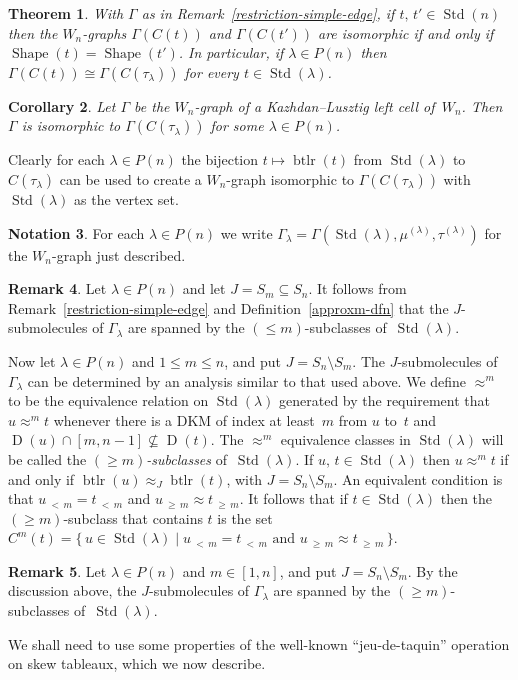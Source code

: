 \documentclass[10pt]{amsart}
\newtheorem{theo}{Theorem}[section]
\newtheorem{coro}[theo]{Corollary}
\theoremstyle{definition}
\newtheorem{rema}[theo]{Remark}
\newtheorem{nota}[theo]{Notation}
\DeclareMathOperator{\word}{btlr}
\newcommand{\lessthan}[2]{#1\,{_{<\,#2}}}
\newcommand{\Morethan}[2]{#1\,{_{\geqslant\,#2}}}
\DeclareMathOperator{\STD}{Std}
\DeclareMathOperator{\shape}{Shape}
\DeclareMathOperator{\D}{D}
\begin{document}
\begin{theo}\label{klthr}
With $\Gamma$ as in Remark~\ref{restriction-simple-edge}, if $t,\,t'\in\STD(n)$
then the $W_n$-graphs $\Gamma(C(t))$ and $\Gamma(C(t'))$
are isomorphic if and only if $\shape(t)=\shape(t')$.
In particular, if $\lambda\in P(n)$ then
$\Gamma(C(t))\cong \Gamma(C(\tau_{\lambda}))$ for every $t\in\STD(\lambda)$.
\end{theo}

\begin{coro}\label{leftcelllambda}
Let $\Gamma$ be the $W_n$-graph of a Kazhdan--Lusztig left cell of~$W_n$. Then
$\Gamma$ is isomorphic to $\Gamma(C(\tau_\lambda))$ for some
$\lambda\in P(n)$.
\end{coro}
Clearly for each $\lambda\in P(n)$ the bijection $t\mapsto\word(t)$
from $\STD(\lambda)$ to $C(\tau_\lambda)$ can be used to create a
$W_n$-graph isomorphic to $\Gamma(C(\tau_\lambda))$ with $\STD(\lambda)$
as the vertex set.

\begin{nota}\label{std-tableau-W-graph}
For each $\lambda\in P(n)$ we write
$\Gamma_\lambda=\Gamma(\STD(\lambda),\mu^{(\lambda)},\tau^{(\lambda)})$ for the
$W_n$-graph just described.
\end{nota}

\begin{rema}\label{Gamma-lambda-submolecules}
Let $\lambda\in P(n)$ and let $J=S_m\subseteq S_n$. It follows from
Remark~\ref{restriction-simple-edge} and Definition~\ref{approxm-dfn}
that the $J$-submolecules of $\Gamma_\lambda$ are spanned by the
$(\leqslant m)$-subclasses of~$\STD(\lambda)$.
\end{rema}
Now let $\lambda\in P(n)$ and $1\leqslant m\leqslant n$, and put
$J=S_n\setminus S_m$. The $J$-submolecules of $\Gamma_\lambda$ can
be determined by an analysis similar to that used above. We define
$\approx^m$ to be the equivalence relation on $\STD(\lambda)$ generated
by the requirement that $u\approx^m t$ whenever there is a DKM
of index at least~$m$ from $u$ to~$t$ and
$\D(u)\cap[m,n-1]\nsubseteq\D(t)$. The $\approx^m$ equivalence
classes in $\STD(\lambda)$ will be called the
\emph{$(\geqslant m)$-subclasses} of~$\STD(\lambda)$.
If $u,\,t\in\STD(\lambda)$ then $u\approx^m t$ if and only if
$\word(u)\approx_J \word(t)$, with $J=S_n\setminus S_m$. An
equivalent condition is that $\lessthan um=\lessthan tm$
and $\Morethan um\approx \Morethan tm$. It follows that if
$t\in\STD(\lambda)$ then the $(\geqslant m)$-subclass that contains
$t$ is the set
$C^m(t) = \{\,u\in\STD(\lambda) \mid\lessthan um = \lessthan tm
\text{ and } \Morethan um\approx \Morethan tm\,\}$.
\begin{rema}\label{Gamma-lambda-submolecules+}
Let $\lambda\in P(n)$ and $m\in[1,n]$, and put $J=S_n\setminus S_m$.
By the discussion above, the $J$-submolecules of $\Gamma_\lambda$ are
spanned by the $(\geqslant m)$-subclasses of~$\STD(\lambda)$.
\end{rema}
We shall need to use some properties of the well-known ``jeu-de-taquin''
operation on skew tableaux, which we now describe.
\end{document}

